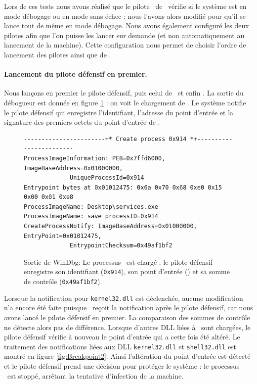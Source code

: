 Lors de ces tests nous avons réalisé que le pilote \driver\ de \duqu\ vérifie si le système est en mode débogage ou en mode sans échec : nous l'avons alors modifié pour qu'il se lance tout de même en mode débogage.
Nous avons également configuré les deux pilotes afin que l'on puisse les lancer sur demande (et non automatiquement au lancement de la machine).
Cette configuration nous permet de choisir l'ordre de lancement des pilotes ainsi que de \services.

\paragraph{Lancement du pilote défensif en premier.}
Nous lançons en premier le pilote défensif, puis celui de \duqu\ et enfin \services.
La sortie du débogueur est donnée en figure \ref{fig:Breakpoint1} : on voit le chargement de \services.
Le système notifie le pilote défensif qui enregistre l'identifiant, l'adresse du point d'entrée et la signature des premiers octets du point d'entrée de \services.

\begin{figure}[h]
\begin{center}
\scriptsize
\begin{lstlisting}[language={}]
-----------------------+* Create process 0x914 *+------------------------
ProcessImageInformation: PEB=0x7ffd6000, ImageBaseAddress=0x01000000,
			 UniqueProcessId=0x914 
Entrypoint bytes at 0x01012475: 0x6a 0x70 0x68 0xe0 0x15 0x00 0x01 0xe8
ProcessImageName: Desktop\services.exe
ProcessImageName: save processID=0x914
CreateProcessNotify: ImageBaseAddress=0x01000000, EntryPoint=0x01012475,
		     EntrypointChecksum=0x49af1bf2
\end{lstlisting}
\end{center}
\caption{Sortie de WinDbg: Le processus \services\ est chargé : le pilote défensif enregistre son identifiant (\texttt{0x914}), son point d'entrée () et sa somme de contrôle (\texttt{0x49af1bf2}).\label{fig:Breakpoint1}}
\end{figure}

Lorsque la notification pour \texttt{kernel32.dll} est déclenchée, aucune modification n'a encore été faite puisque \duqu\ reçoit la notification après le pilote défensif, car nous avons lancé le pilote défensif en premier.
La comparaison des sommes de contrôle ne détecte alors pas de différence.
Lorsque d'autres DLL liées à \services\ sont chargées, le pilote défensif vérifie à nouveau le point d'entrée qui a cette fois été altéré.
Le traitement des notifications liées aux DLL \texttt{kernel32.dll} et \texttt{shell32.dll} est montré en figure \ref{fig:Breakpoint2}.
Ainsi l'altération du point d'entrée est détecté et le pilote défensif prend une décision pour protéger le système : le processus \services\ est stoppé, arrêtant la tentative d'infection de la machine.


